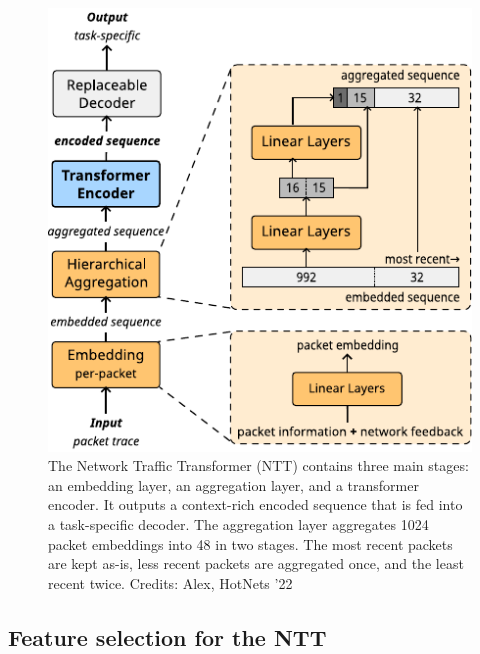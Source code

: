 \begin{figure}[!hbt]
  \begin{center}
    \includegraphics[scale=1.5]{figures/architecture_ntt.pdf}
    \caption{The Network Traffic Transformer (NTT) contains three main stages:  %
        an embedding layer, %
        an aggregation layer, and
        a transformer encoder.
        It outputs a context-rich encoded sequence that is fed into a task-specific decoder.
        The aggregation layer aggregates 1024 packet embeddings into 48 in two stages.
        The most recent packets are kept as-is, less recent packets are aggregated once, and the least recent twice.
    Credits: Alex, HotNets '22}
    \label{fig:ntt}
  \end{center}
\end{figure}

\subsection{Feature selection for the NTT}
\label{ssec:desfeat}

